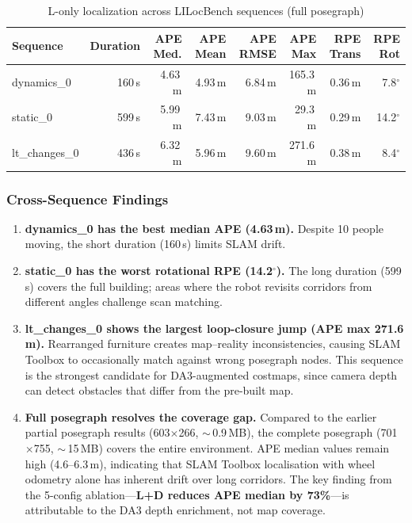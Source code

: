 \documentclass[11pt,a4paper]{article}
\begin{document}
\begin{table}[h]
\centering
\caption{L-only localization across LILocBench sequences (full posegraph)}
\label{tab:cross-sequence}
\begin{tabular}{lrrrrrrr}
\toprule
\textbf{Sequence} & \textbf{Duration}
  & \textbf{APE Med.} & \textbf{APE Mean} & \textbf{APE RMSE}
  & \textbf{APE Max}
  & \textbf{RPE Trans} & \textbf{RPE Rot} \\
\midrule
dynamics\_0     &  160\,s & 4.63\,m & 4.93\,m &  6.84\,m & 165.3\,m & 0.36\,m &  7.8$^\circ$ \\
static\_0       &  599\,s & 5.99\,m & 7.43\,m &  9.03\,m &  29.3\,m & 0.29\,m & 14.2$^\circ$ \\
lt\_changes\_0  &  436\,s & 6.32\,m & 5.96\,m &  9.60\,m & 271.6\,m & 0.38\,m &  8.4$^\circ$ \\
\bottomrule
\end{tabular}
\end{table}

\subsubsection{Cross-Sequence Findings}

\begin{enumerate}[nosep]
  \item \textbf{dynamics\_0 has the best median APE (4.63\,m).}  Despite
    10 people moving, the short duration (160\,s) limits SLAM drift.

  \item \textbf{static\_0 has the worst rotational RPE (14.2$^\circ$).}
    The long duration (599\,s) covers the full building; areas where the
    robot revisits corridors from different angles challenge scan
    matching.

  \item \textbf{lt\_changes\_0 shows the largest loop-closure jump
    (APE max 271.6\,m).}  Rearranged furniture creates map--reality
    inconsistencies, causing SLAM Toolbox to occasionally match against
    wrong posegraph nodes.  This sequence is the strongest candidate
    for DA3-augmented costmaps, since camera depth can detect obstacles
    that differ from the pre-built map.

  \item \textbf{Full posegraph resolves the coverage gap.}  Compared to
    the earlier partial posegraph results (603$\times$266, $\sim$\,0.9\,MB),
    the complete posegraph (701$\times$755, $\sim$\,15\,MB) covers the
    entire environment.  APE median values remain high (4.6--6.3\,m),
    indicating that SLAM Toolbox localisation with wheel odometry alone
    has inherent drift over long corridors.  The key finding from the
    5-config ablation---\textbf{L+D reduces APE median by 73\%}---is
    attributable to the DA3 depth enrichment, not map coverage.
\end{enumerate}
\end{document}
